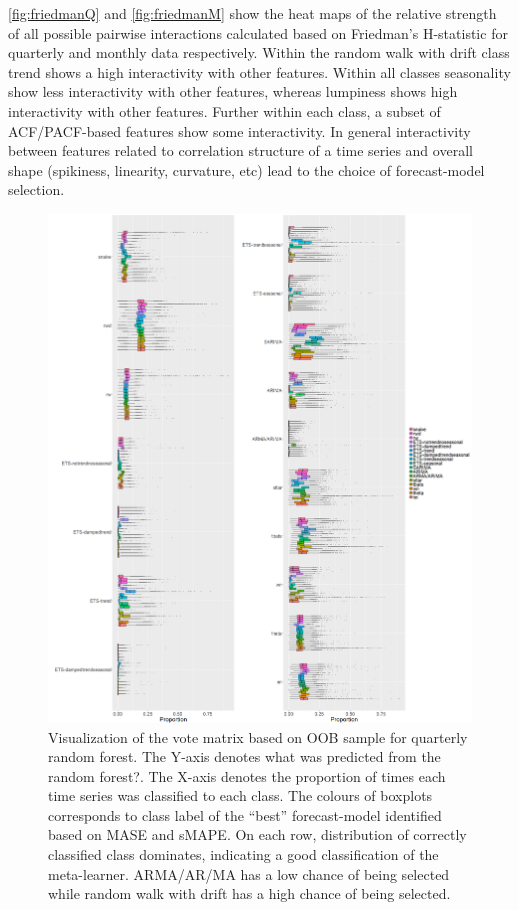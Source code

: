 \documentclass[11pt,a4paper,]{article}
\begin{document}
\autoref{fig:friedmanQ} and \autoref{fig:friedmanM} show the heat maps
of the relative strength of all possible pairwise interactions
calculated based on Friedman's H-statistic for quarterly and monthly
data respectively. Within the random walk with drift class trend shows a
high interactivity with other features. Within all classes seasonality
show less interactivity with other features, whereas lumpiness shows
high interactivity with other features. Further within each class, a
subset of ACF/PACF-based features show some interactivity. In general
interactivity between features related to correlation structure of a
time series and overall shape (spikiness, linearity, curvature, etc)
lead to the choice of forecast-model selection.

\begin{figure}
\centering
\includegraphics{figures/oobquarterlymonthly1-1.png}
\caption{\label{fig:oobquarterlymonthly1}Visualization of the vote matrix
based on OOB sample for quarterly random forest. The Y-axis denotes what
was predicted from the random forest?. The X-axis denotes the proportion
of times each time series was classified to each class. The colours of
boxplots corresponds to class label of the ``best'' forecast-model
identified based on MASE and sMAPE. On each row, distribution of
correctly classified class dominates, indicating a good classification
of the meta-learner. ARMA/AR/MA has a low chance of being selected while
random walk with drift has a high chance of being selected.}
\end{figure}
\end{document}
